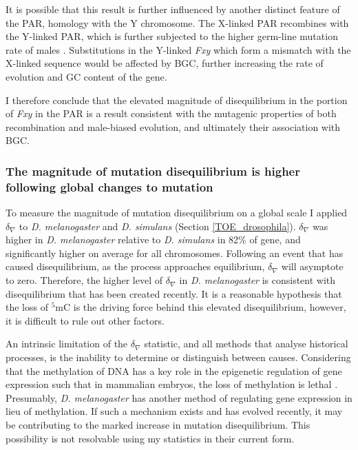 It is possible that this result is further influenced by another distinct feature of the PAR, homology with the Y chromosome. The X-linked PAR recombines with the Y-linked PAR, which is further subjected to the higher germ-line mutation rate of males \citep{Huttley2000HowMutagenesis}. Substitutions in the Y-linked \textit{Fxy} which form a mismatch with the X-linked sequence would be affected by BGC, further increasing the rate of evolution and GC content of the gene. 

I therefore conclude that the elevated magnitude of disequilibrium in the portion of \textit{Fxy} in the PAR is a result consistent with the mutagenic properties of both recombination and male-biased evolution, and ultimately their association with BGC. 

\subsubsection{The magnitude of mutation disequilibrium is higher following global changes to mutation}

To measure the magnitude of mutation disequilibrium on a global scale I applied $\delta_\nabla$ to \textit{D. melanogaster} and \textit{D. simulans} (Section \ref{TOE_drosophila}). $\delta_\nabla$ was higher in \textit{D. melanogaster} relative to \textit{D. simulans} in 82\% of gene, and significantly higher on average for all chromosomes. Following an event that has caused disequilibrium, as the process approaches equilibrium, $\delta_\nabla$ will asymptote to zero. Therefore, the higher level of $\delta_\nabla$ in \textit{D. melanogaster} is consistent with disequilibrium that has been created recently. It is a reasonable hypothesis that the loss of $^5$mC is the driving force behind this elevated disequilibrium, however, it is difficult to rule out other factors. 

An intrinsic limitation of the $\delta_\nabla$ statistic, and all methods that analyse historical processes, is the inability to determine or distinguish between causes. Considering that the methylation of DNA has a key role in the epigenetic regulation of gene expression \citep{Holliday1975DNADevelopment, Compere1981DNACells, Lieberman1983UltravioletDemethylation} such that in mammalian embryos, the loss of methylation is lethal \citep{Panning1996DNAGenes}. Presumably, \textit{D. melanogaster}  has another method of regulating gene expression in lieu of methylation. If such a mechanism exists and has evolved recently, it may be contributing to the marked increase in mutation disequilibrium. This possibility is not resolvable using my statistics in their current form. 


